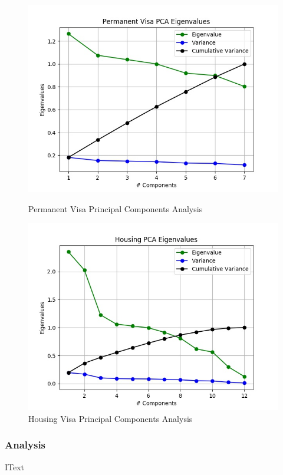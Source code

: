 \documentclass[h]{article}
\begin{document}
 \begin{figure}[H]
      \includegraphics[width=1\textwidth,keepaspectratio]{permanent_visa_pca_eigenvalues.jpg} 
      \caption*{Permanent Visa Principal Components Analysis } 
   \endminipage\hfill
      \includegraphics[width=1\textwidth,keepaspectratio]{housing_pca_eigenvalues.jpg} 
      \caption*{Housing Visa Principal Components Analysis } 
   \endminipage\hfill
\end{figure}

\subsubsection*{Analysis}
IText
\end{document}
